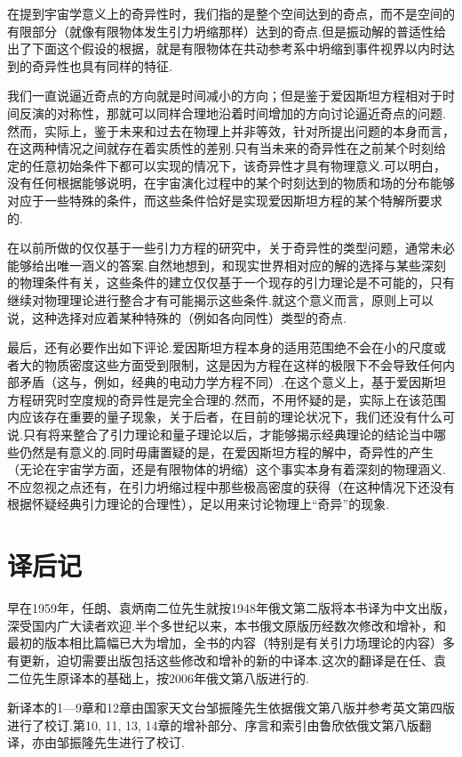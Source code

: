 在提到宇宙学意义上的奇异性时，我们指的是整个空间达到的奇点，而不是空间的有限部分（就像有限物体发生引力坍缩那样）达到的奇点.但是振动解的普适性给出了下面这个假设的根据，就是有限物体在共动参考系中坍缩到事件视界以内时达到的奇异性也具有同样的特征.

我们一直说逼近奇点的方向就是时间减小的方向；但是鉴于爱因斯坦方程相对于时间反演的对称性，那就可以同样合理地沿着时间增加的方向讨论逼近奇点的问题.然而，实际上，鉴于未来和过去在物理上并非等效，针对所提出问题的本身而言，在这两种情况之间就存在着实质性的差别.只有当未来的奇异性在之前某个时刻给定的任意初始条件下都可以实现的情况下，该奇异性才具有物理意义.可以明白，没有任何根据能够说明，在宇宙演化过程中的某个时刻达到的物质和场的分布能够对应于一些特殊的条件，而这些条件恰好是实现爱因斯坦方程的某个特解所要求的.

在以前所做的仅仅基于一些引力方程的研究中，关于奇异性的类型问题，通常未必能够给出唯一涵义的答案.自然地想到，和现实世界相对应的解的选择与某些深刻的物理条件有关，这些条件的建立仅仅基于一个现存的引力理论是不可能的，只有继续对物理理论进行整合才有可能揭示这些条件.就这个意义而言，原则上可以说，这种选择对应着某种特殊的（例如各向同性）类型的奇点.

最后，还有必要作出如下评论.爱因斯坦方程本身的适用范围绝不会在小的尺度或者大的物质密度这些方面受到限制，这是因为方程在这样的极限下不会导致任何内部矛盾（这与，例如，经典的电动力学方程不同）.在这个意义上，基于爱因斯坦方程研究时空度规的奇异性是完全合理的.然而，不用怀疑的是，实际上在该范围内应该存在重要的量子现象，关于后者，在目前的理论状况下，我们还没有什么可说.只有将来整合了引力理论和量子理论以后，才能够揭示经典理论的结论当中哪些仍然是有意义的.同时毋庸置疑的是，在爱因斯坦方程的解中，奇异性的产生（无论在宇宙学方面，还是有限物体的坍缩）这个事实本身有着深刻的物理涵义.不应忽视之点还有，在引力坍缩过程中那些极高密度的获得（在这种情况下还没有根据怀疑经典引力理论的合理性），足以用来讨论物理上“奇异”的现象.

\chapter*{译后记}

早在1959年，任朗、袁炳南二位先生就按1948年俄文第二版将本书译为中文出版，深受国内广大读者欢迎.半个多世纪以来，本书俄文原版历经数次修改和增补，和最初的版本相比篇幅已大为增加，全书的内容（特别是有关引力场理论的内容）多有更新，迫切需要出版包括这些修改和增补的新的中译本.这次的翻译是在任、袁二位先生原译本的基础上，按2006年俄文第八版进行的.

新译本的1—9章和12章由国家天文台邹振隆先生依据俄文第八版并参考英文第四版进行了校订.第10, 11, 13, 14章的增补部分、序言和索引由鲁欣依俄文第八版翻译，亦由邹振隆先生进行了校订.


